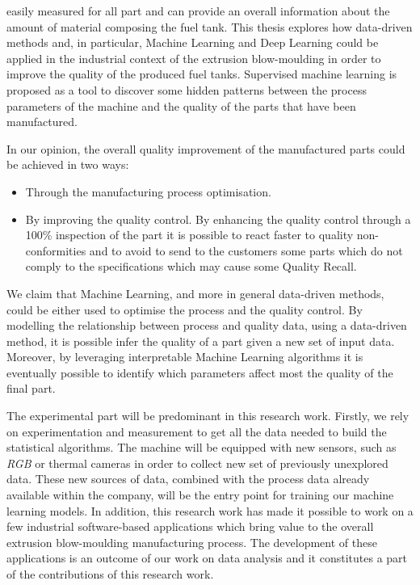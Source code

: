 easily measured for all part and can provide an overall information about the amount of material composing the fuel tank. This thesis explores how data-driven methods and, in particular, Machine Learning and Deep Learning could be applied in the industrial context of the extrusion blow-moulding in order to improve the quality of the produced fuel tanks. Supervised machine learning is proposed as a tool to discover some hidden patterns between the process parameters of the machine and the quality of the parts that have been manufactured.

In our opinion, the overall quality improvement of the manufactured parts could be achieved in two ways:

\begin{itemize}
    \item Through the manufacturing process optimisation.   
    \item By improving the quality control. By enhancing the quality control through a 100\% inspection of the part it is possible to react faster to quality non-conformities and to avoid to send to the customers some parts which do not comply to the specifications which may cause some Quality Recall.  
\end{itemize}
%
We claim that Machine Learning, and more in general data-driven methods, could be either used to optimise the process and the quality control. By modelling the relationship between process and quality data, using a data-driven method, it is possible infer the quality of a part given a new set of input data. Moreover, by leveraging interpretable Machine Learning algorithms it is eventually possible to identify which parameters affect most the quality of the final part.    

The experimental part will be predominant in this research work. Firstly, we rely on experimentation and measurement to get all the data needed to build the statistical algorithms. The machine will be equipped with new sensors, such as \textit{RGB} or thermal cameras in order to collect new set of previously unexplored data. These new sources of data, combined with the process data already available within the company, will be the entry point for training our machine learning models. In addition, this research work has made it possible to work on a few industrial software-based applications which bring value to the overall extrusion blow-moulding manufacturing process. The development of these applications is an outcome of our work on data analysis and it constitutes a part of the contributions of this research work.

